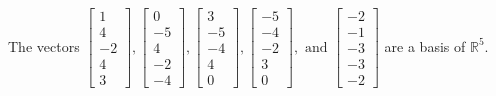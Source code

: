 \begin{exercise}
\begin{exerciseStatement}
  \end{exerciseStatement}
  \begin{exerciseAnswer}
   The vectors \(\left[\begin{array}{r}
1 \\
4 \\
-2 \\
4 \\
3
\end{array}\right] , \left[\begin{array}{r}
0 \\
-5 \\
4 \\
-2 \\
-4
\end{array}\right] , \left[\begin{array}{r}
3 \\
-5 \\
-4 \\
4 \\
0
\end{array}\right] , \left[\begin{array}{r}
-5 \\
-4 \\
-2 \\
3 \\
0
\end{array}\right] , \text{ and } \left[\begin{array}{r}
-2 \\
-1 \\
-3 \\
-3 \\
-2
\end{array}\right]\) 
  	 are  a basis of \(\mathbb{R}^5\).
  


  \end{exerciseAnswer}
\end{exercise}